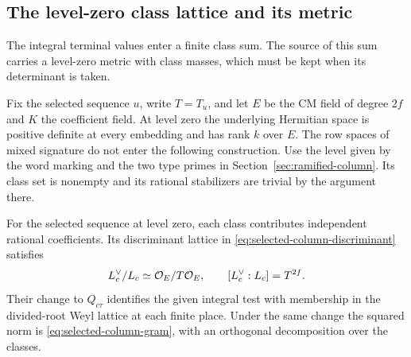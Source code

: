 \subsection{The level-zero class lattice and its metric}
\label{subsec:selected-column-metric}

The integral terminal values enter a finite class sum. The source of this sum carries a level-zero metric with class masses, which must be kept when its determinant is taken.

Fix the selected sequence \(u\), write \(T=T_u\), and let \(E\) be the CM field of degree \(2f\) and \(K\) the coefficient field.
At level zero the underlying Hermitian space is positive definite
at every embedding and has rank \(k\) over \(E\). The row spaces
of mixed signature do not enter the following construction.
Use the level given by the word marking and the two type primes
in Section~\ref{sec:ramified-column}. Its class set is nonempty
and its rational stabilizers are trivial by the argument there.

\begin{proposition}\label{prop:level-zero-column-coordinates}
For the selected sequence at level zero, each class contributes independent rational coefficients. Its discriminant lattice in \eqref{eq:selected-column-discriminant} satisfies
\[
 L_c^\vee/L_c\simeq{\cal O}_E/T{\cal O}_E,\qquad [L_c^\vee:L_c]=T^{2f}.
\]
 Their change
to \(Q_{c\tau}\) identifies the given integral test with membership
in the divided-root Weyl lattice at each finite place. Under the
same change the squared norm is \eqref{eq:selected-column-gram},
with an orthogonal decomposition over the classes.
\end{proposition}

